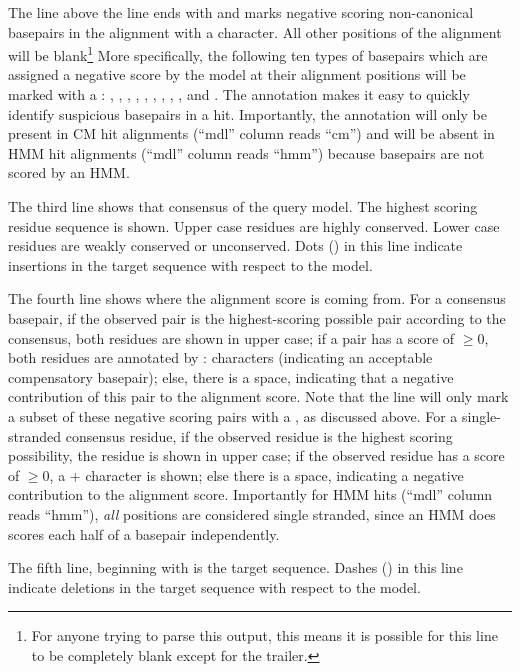 The line above the  line ends with  and marks
negative scoring non-canonical basepairs in the alignment with a
 character. All other positions of the alignment will be
blank\footnote{For anyone trying to parse this output, this means it
is possible for this line to be completely blank except for the
 trailer.} More specifically, the following ten types of
basepairs which are assigned a negative score by the model at their
alignment positions will be marked with a : ,
, , , , ,
, , , and . The 
annotation makes it easy to quickly identify suspicious basepairs in
a hit. Importantly, the  annotation will only be present in
CM hit alignments (``mdl'' column reads ``cm'') and will be absent in
HMM hit alignments (``mdl'' column reads ``hmm'') because basepairs
are not scored by an HMM.

The third line shows that consensus of the query model. The highest
scoring residue sequence is shown. Upper case residues are highly
conserved. Lower case residues are weakly conserved or unconserved.
Dots () in this line indicate insertions in the target
sequence with respect to the model.

The fourth line shows where the alignment score is coming from. For a
consensus basepair, if the observed pair is the highest-scoring
possible pair according to the consensus, both residues are shown in
upper case; if a pair has a score of $\geq 0$, both residues are
annotated by : characters (indicating an acceptable compensatory
basepair); else, there is a space, indicating that a negative
contribution of this pair to the alignment score. Note that the 
 line will only mark a subset of these negative scoring
pairs with a , as discussed above.
For a single-stranded consensus residue, if the observed residue is
the highest scoring possibility, the residue is shown in upper case;
if the observed residue has a score of $\geq 0$, a \verb+++ character
is shown; else there is a space, indicating a negative contribution to
the alignment score. Importantly for HMM hits (``mdl'' column reads
``hmm''), \emph{all} positions are considered single stranded, since
an HMM does scores each half of a basepair independently.

The fifth line, beginning with  is
the target sequence. Dashes (\otext{-}) in this line indicate deletions
in the target sequence with respect to the model.

